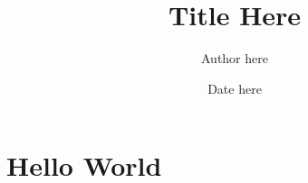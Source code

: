 \documentclass{article}
\title{Title Here}
\author{Author here}
\date{Date here}
\begin{document}
\maketitle
\thispagestyle{empty}
\newpage

\section{Hello World}
\end{document}
